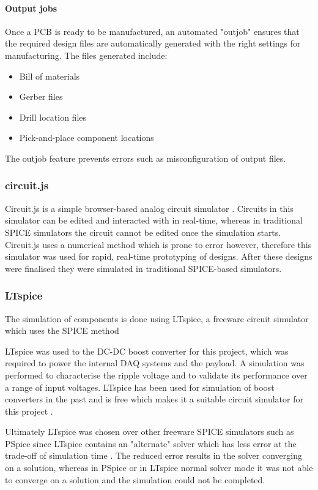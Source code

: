 \documentclass[a4paper,11pt]{article}
\begin{document}
\paragraph{Output jobs}
Once a PCB is ready to be manufactured, an automated "outjob" ensures that the required design files are automatically generated with the right settings for manufacturing. The files generated include:
\begin{itemize}
  \item Bill of materials
  \item Gerber files
  \item Drill location files
  \item Pick-and-place component locations
\end{itemize}


The outjob feature prevents errors such as misconfiguration of output files.


\subsubsection{circuit.js}

Circuit.js is a simple browser-based analog circuit simulator \cite{falstad22falstad}. Circuits in this simulator can be edited and interacted with in real-time, whereas in traditional SPICE simulators the circuit cannot be edited once the simulation starts. Circuit.js uses a numerical method which is prone to error however, therefore this simulator was used for rapid, real-time prototyping of designs. After these designs were finalised they were simulated in traditional SPICE-based simulators.

\subsubsection{LTspice}

The simulation of components is done using LTspice, a freeware circuit simulator which uses the SPICE method

LTspice was used to the DC-DC boost converter for this project, which was required to power the internal DAQ systems and the payload. A simulation was performed to characterise the ripple voltage and to validate its performance over a range of input voltages. LTspice has been used for simulation of boost converters in the past and is free which makes it a suitable circuit simulator for this project \cite{giesselmann2019modeling}.

Ultimately LTspice was chosen over other freeware SPICE simulators such as PSpice since LTspice contains an "alternate" solver which has less error at the trade-off of simulation time \cite{ltspice2022}. The reduced error results in the solver converging on a solution, whereas in PSpice or in LTspice normal solver mode it was not able to converge on a solution and the simulation could not be completed.
\end{document}
